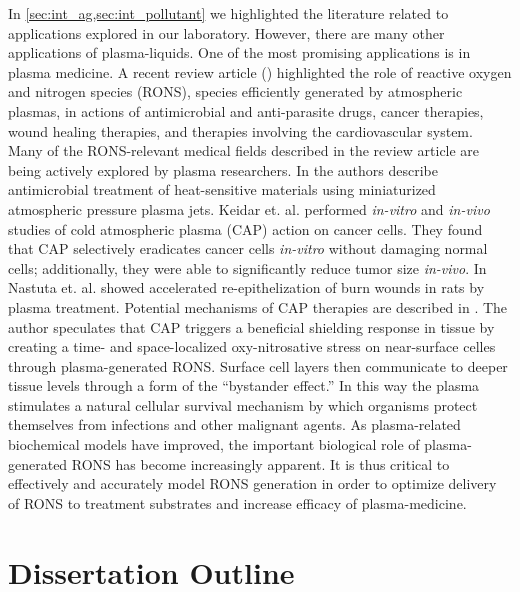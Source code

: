 In \cref{sec:int_ag,sec:int_pollutant} we highlighted the literature related to applications explored in our laboratory. However, there are many other applications of plasma-liquids. One of the most promising applications is in plasma medicine. A recent review article (\cite{graves2012emerging}) highlighted the role of reactive oxygen and nitrogen species (RONS), species efficiently generated by atmospheric plasmas, in actions of antimicrobial and anti-parasite drugs, cancer therapies, wound healing therapies, and therapies involving the cardiovascular system. Many of the RONS-relevant medical fields described in the review article are being actively explored by plasma researchers. In \cite{weltmann2008antimicrobial} the authors describe antimicrobial treatment of heat-sensitive materials using miniaturized atmospheric pressure plasma jets. Keidar et. al. \cite{keidar2013cold} performed \textit{in-vitro} and \textit{in-vivo} studies of cold atmospheric plasma (CAP) action on cancer cells. They found that CAP selectively eradicates cancer cells \textit{in-vitro} without damaging normal cells; additionally, they were able to significantly reduce tumor size \textit{in-vivo}. In \cite{nastuta2011stimulation} Nastuta et. al. showed accelerated re-epithelization of burn wounds in rats by plasma treatment. Potential mechanisms of CAP therapies are described in \cite{Graves2014review}. The author speculates that CAP triggers a beneficial shielding response in tissue by creating a time- and space-localized oxy-nitrosative stress on near-surface celles through plasma-generated RONS. Surface cell layers then communicate to deeper tissue levels through a form of the ``bystander effect.'' In this way the plasma stimulates a natural cellular survival mechanism by which organisms protect themselves from infections and other malignant agents. \cite{Graves2014review} As plasma-related biochemical models have improved, the important biological role of plasma-generated RONS has become increasingly apparent. It is thus critical to effectively and accurately model RONS generation in order to optimize delivery of RONS to treatment substrates and increase efficacy of plasma-medicine.

\section{Dissertation Outline}

